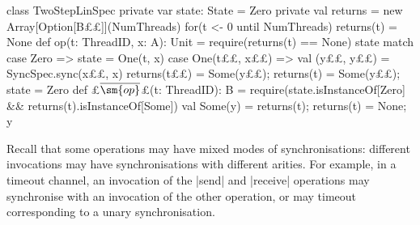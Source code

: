 \begin{trivlist}
\item[]
\begin{minipage}{92mm}
\begin{scala}
class TwoStepLinSpec{
  private var state: State = Zero
  private val returns = new Array[Option[B££]](NumThreads)
  for(t <- 0 until NumThreads) returns(t) = None
  def op(t: ThreadID, x: A): Unit = {
    require(returns(t) == None)
    state match{
      case Zero => state = One(t, x)
      case One(t££, x££) => 
        val (y££, y££) = SyncSpec.sync(x££, x) 
        returns(t££) = Some(y££); returns(t) = Some(y££); state = Zero
    }
  }
  def £$\overline{\sm{op}}$£(t: ThreadID): B = {
    require(state.isInstanceOf[Zero] && returns(t).isInstanceOf[Some])
    val Some(y) = returns(t); returns(t) = None; y
  }
}
\end{scala}
\end{minipage}
\hfill 
%
\begin{minipage}{37.8mm}
%
\vspace{40mm}
\end{minipage}%
\end{trivlist}




Recall that some operations may have mixed modes of synchronisations:
different invocations may have synchronisations with different arities.  For
example, in a timeout channel, an invocation of the |send| and |receive|
operations may synchronise with an invocation of the other operation, or may
timeout corresponding to a unary synchronisation.
%

